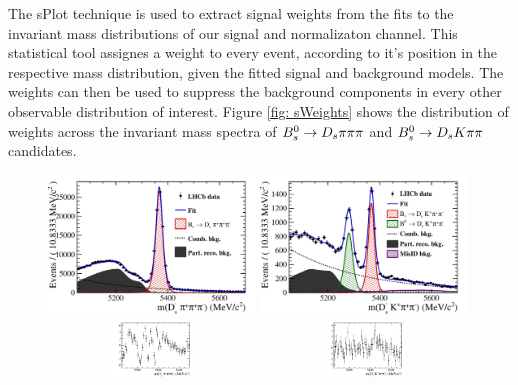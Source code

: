 The sPlot technique \cite{Pivk:2004ty} is used to extract signal weights from the fits to the invariant mass distributions of our signal and normalizaton channel. 
This statistical tool assignes a weight to every event, according to it's position in the respective mass distribution, given the fitted signal and background models. 
The weights can then be used to suppress the background components in every other observable distribution of interest.  
Figure \ref{fig: sWeights} shows the distribution of weights across the invariant mass spectra of ${{B}^0_{s}}\rightarrow{\ensuremath{{D}_{s}}}{\ensuremath{\pi}}{\ensuremath{\pi}}{\ensuremath{\pi}}$ and ${{B}^0_{s}}\rightarrow{\ensuremath{{D}_{s}}}{\ensuremath{K}}{\ensuremath{\pi}}{\ensuremath{\pi}}$ candidates.


\begin{figure}[h]
\includegraphics[height=7.cm,width=0.49\textwidth]{figs/norm.pdf}
\includegraphics[height=7.cm,width=0.49\textwidth]{figs/signal.pdf}\\
\includegraphics[width=0.49\textwidth,height=1.5cm]{figs/norm_pull.pdf}
\includegraphics[width=0.49\textwidth,height=1.5cm]{figs/signal_pull.pdf}

\end{figure}
